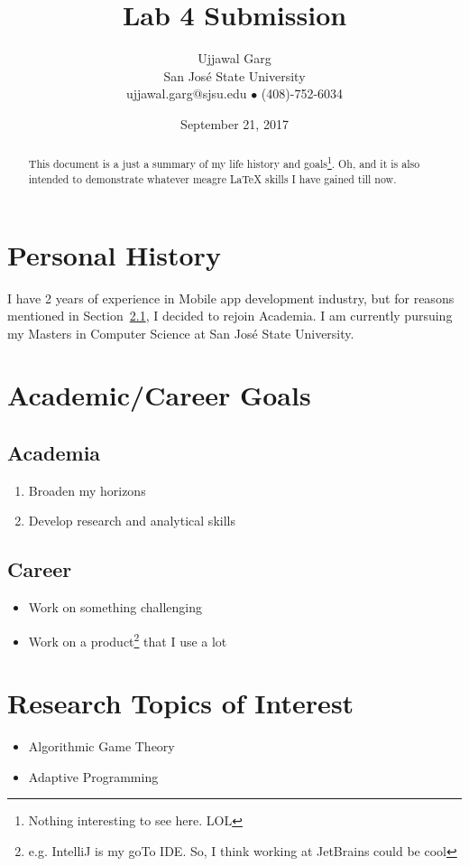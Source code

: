 \documentclass{article}
\title{Lab 4 Submission}
\author{
	Ujjawal Garg \\
	San Jos\'{e} State University \\
	ujjawal.garg@sjsu.edu $\bullet$ (408)-752-6034
	}
\date{September 21, 2017}
\begin{document}
\maketitle

\begin{abstract}
\noindent %
This document is a just a summary of my life history and goals\footnote{Nothing interesting to see here. LOL}. Oh, and it is also intended to demonstrate whatever meagre \LaTeX{} skills I have gained till now.
\end{abstract}

\section{Personal History}
I have 2 years of experience in Mobile app development industry, but for reasons mentioned in Section~\ref{sec:Academia}, I decided to rejoin Academia. I am currently pursuing my Masters in Computer Science at San Jos\'{e} State University. 

\section{Academic/Career Goals}

\subsection{Academia} \label{sec:Academia}
\begin{enumerate}
\item Broaden my horizons
\item Develop research and analytical skills
\end{enumerate}

\subsection{Career} 
\begin{itemize}
\item Work on something challenging
\item Work on a product\footnote{e.g. IntelliJ is my goTo IDE. So, I think working at JetBrains could be cool} that I use a lot
\end{itemize}

\section{Research Topics of Interest}
\begin{itemize}
\item Algorithmic Game Theory~\cite{nisan2007algorithmic}
\item Adaptive Programming~\cite{simpkins2008towards}
\end{itemize}






\end{document}
